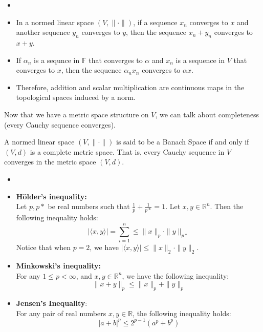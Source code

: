 \begin{recall}
    \begin{itemize}
        \item []
        \item In a normed linear space $(V,\|\cdot\|)$, if a sequence $x_{n}$ converges to $x$ and another sequence $y_{n}$ converges to $y$, then the sequence $x_{n}+y_{n}$ converges to $x+y$.
        \item If $\alpha_{n}$ is a sequnce in $\mathbb{F}$ that converges to $\alpha$ and $x_{n}$ is a sequence in $V$ that converges to $x$, then the sequence $\alpha_{n}x_{n}$ converges to $\alpha x$.
        \item Therefore, addition and scalar multiplication are continuous maps in the topological spaces induced by a norm.
    \end{itemize}
\end{recall}
\vspace{0.4cm}
\begin{motive}
    Now that we have a metric space structure on $V$, we can talk about completeness (every Cauchy sequence converges).
\end{motive}
\vspace{0.4cm}
\begin{definition}
    A normed linear space $(V,\|\cdot\|)$ is said to be a Banach Space if and only if $(V,d)$ is a complete metric space. That is, every Cauchy sequence in $V$ converges in the metric space $(V,d)$.
\end{definition}
\vspace{0.4cm}
\begin{recall}
    \begin{itemize}
        \item []
        \item \textbf{H\"older's inequality:}\\ 
            \hypertarget{holder}{Let $p,p*$ be real numbers such that $\frac{1}{p}+\frac{1}{p*}=1$. Let $x,y\in \mathbb{R}^{n}$. Then the following inequality holds: $$|\langle x,y\rangle|=\sum_{i=1}^{n}\leq \|x\|_{p}\cdot\|y\|_{p*}$$}
            Notice that when $p=2$, we have $|\langle x,y\rangle|\leq\|x\|_{2}\cdot\|y\|_{2}$.
        \item \textbf{Minkowski's inequality:}\\ 
            \hypertarget{minkowski}{For any $1\leq p<\infty$, and $x,y\in \mathbb{R}^{n}$, we have the following inequality: $$\|x+y\|_{p}\leq\|x\|_{p}+\|y\|_{p}$$}
        \item \textbf{Jensen's Inequality}:\\ 
            \hypertarget{jensen}{For any pair of real numbers $x,y\in \mathbb{R}$, the following inequality holds: $$|a+b|^{p}\leq2^{p-1}(a^{p}+b^{p})$$}
    \end{itemize}

\end{recall}

